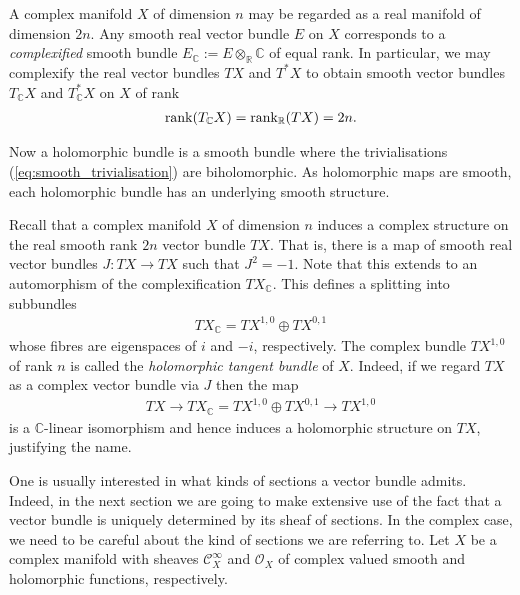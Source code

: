 \documentclass[12pt]{ociamthesis}  %
\begin{document}
\begin{example}
  A complex manifold $X$ of dimension $n$ may be regarded as a
  real manifold of dimension $2n$. Any smooth real vector bundle
  $E$ on $X$ corresponds to a \emph{complexified} smooth bundle
  $E_{\mathbb{C}} := E\otimes_{\mathbb{R}} \mathbb{C}$ of equal rank.
  In particular, we may complexify the real vector bundles
  $TX$ and $T^*X$ to obtain smooth vector bundles
  $T_{\mathbb{C}} X$ and $T_{\mathbb{C}}^*X$
  on $X$ of rank
  \begin{align*}
    \operatorname{rank}(T_\mathbb{C} X)
    = \operatorname{rank}_{\mathbb{R}} (TX) = 2n.
  \end{align*}
\end{example}

Now a holomorphic bundle is a smooth bundle where the trivialisations
(\ref{eq:smooth_trivialisation}) are biholomorphic. As holomorphic
maps are smooth, each holomorphic bundle has an underlying smooth
structure.

\begin{example}
  Recall that a complex manifold $X$ of dimension $n$ induces a
  complex structure on the real smooth rank $2n$ vector bundle $TX$.
  That is, there is a map of smooth real vector bundles
  $J : TX \to TX$ such that $J^2 = -1$. Note that this extends to
  an automorphism of the complexification $TX_{\mathbb{C}}$.
  This defines a splitting into subbundles
  \begin{align}\label{eq:tangent_decomposition}
    TX_{\mathbb{C}}  = TX^{1,0} \oplus TX^{0,1}
  \end{align}
  whose fibres are eigenspaces of $i$ and $-i$, respectively. The
  complex bundle $TX^{1,0}$ of rank $n$ is called the
  \emph{holomorphic tangent bundle} of $X$. Indeed, if we regard $TX$
  as a complex vector bundle via $J$ then the map
  \begin{align}\label{eq:holomorphic_tangent_bundle}
    TX
    \longrightarrow TX_{\mathbb C}
    = TX^{1,0} \oplus TX^{0,1}
    \longrightarrow TX^{1,0}
  \end{align}
  is a $\mathbb{C}$-linear isomorphism and hence induces a holomorphic
  structure on $TX$, justifying the name.
\end{example}

One is usually interested in what kinds of sections a vector bundle
admits. Indeed, in the next section we are going to make extensive use
of the fact that a vector bundle is uniquely determined by its sheaf
of sections. In the complex case, we need to be careful about the
kind of sections we are referring to. Let $X$ be a complex manifold
with sheaves $\mathscr C^\infty_X$ and $\mathscr O_X$ of complex
valued smooth and holomorphic functions, respectively.
\end{document}
